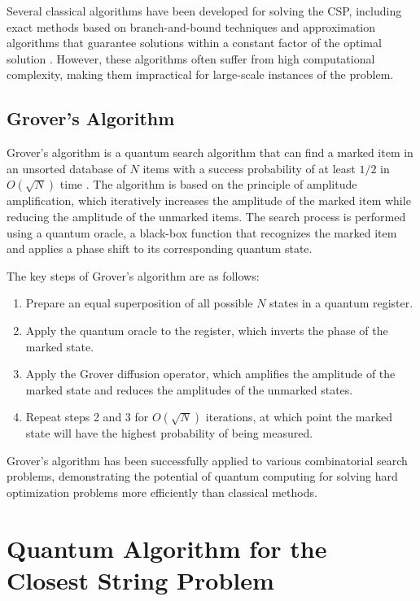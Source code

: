 Several classical algorithms have been developed for solving the CSP, including exact methods based on branch-and-bound techniques \cite{frances2002closer} and approximation algorithms that guarantee solutions within a constant factor of the optimal solution \cite{gramm2003worst}. However, these algorithms often suffer from high computational complexity, making them impractical for large-scale instances of the problem.

\subsection{Grover's Algorithm}

Grover's algorithm is a quantum search algorithm that can find a marked item in an unsorted database of $N$ items with a success probability of at least $1/2$ in $O(\sqrt{N})$ time \cite{grover1996fast}. The algorithm is based on the principle of amplitude amplification, which iteratively increases the amplitude of the marked item while reducing the amplitude of the unmarked items. The search process is performed using a quantum oracle, a black-box function that recognizes the marked item and applies a phase shift to its corresponding quantum state.

The key steps of Grover's algorithm are as follows:

\begin{enumerate}
  \item Prepare an equal superposition of all possible $N$ states in a quantum register.
  
  \item Apply the quantum oracle to the register, which inverts the phase of the marked state.
  
  \item Apply the Grover diffusion operator, which amplifies the amplitude of the marked state and reduces the amplitudes of the unmarked states.
  
  \item Repeat steps 2 and 3 for $O(\sqrt{N})$ iterations, at which point the marked state will have the highest probability of being measured.
\end{enumerate}

Grover's algorithm has been successfully applied to various combinatorial search problems, demonstrating the potential of quantum computing for solving hard optimization problems more efficiently than classical methods.

\section{Quantum Algorithm for the Closest String Problem}\label{sec:algorithm}

